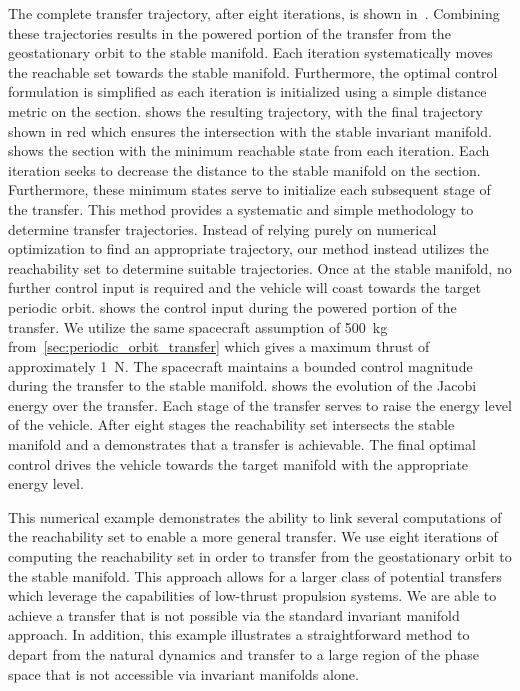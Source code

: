 The complete transfer trajectory, after eight iterations, is shown in~. 
Combining these trajectories results in the powered portion of the transfer from the geostationary orbit to the stable manifold. 
Each iteration systematically moves the reachable set towards the stable manifold. 
Furthermore, the optimal control formulation is simplified as each iteration is initialized using a simple distance metric on the \Poincare section.
 shows the resulting trajectory, with the final trajectory shown in red which ensures the intersection with the stable invariant manifold.
 shows the \Poincare section with the minimum reachable state from each iteration.
Each iteration seeks to decrease the distance to the stable manifold on the \Poincare section.
Furthermore, these minimum states serve to initialize each subsequent stage of the transfer. 
This method provides a systematic and simple methodology to determine transfer trajectories.
Instead of relying purely on numerical optimization to find an appropriate trajectory, our method instead utilizes the reachability set to determine suitable trajectories.
Once at the stable manifold, no further control input is required and the vehicle will coast towards the target periodic orbit.
 shows the control input during the powered portion of the transfer. 
We utilize the same spacecraft assumption of \SI{500}{\kilo\gram} from~\cref{sec:periodic_orbit_transfer} which gives a maximum thrust of approximately \SI{1}{\newton}.
The spacecraft maintains a bounded control magnitude during the transfer to the stable manifold.
 shows the evolution of the Jacobi energy over the transfer.
Each stage of the transfer serves to raise the energy level of the vehicle.
After eight stages the reachability set intersects the stable manifold and a demonstrates that a transfer is achievable.
The final optimal control drives the vehicle towards the target manifold with the appropriate energy level.


This numerical example demonstrates the ability to link several computations of the reachability set to enable a more general transfer.
We use eight iterations of computing the reachability set in order to transfer from the geostationary orbit to the stable manifold.
This approach allows for a larger class of potential transfers which leverage the capabilities of low-thrust propulsion systems.
We are able to achieve a transfer that is not possible via the standard invariant manifold approach. 
In addition, this example illustrates a straightforward method to depart from the natural dynamics and transfer to a large region of the phase space that is not accessible via invariant manifolds alone.
